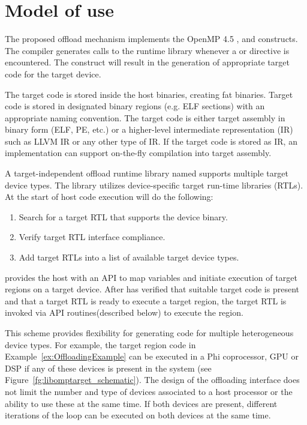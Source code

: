 \section{Model of use}

The proposed offload mechanism implements the OpenMP 4.5 \dtargetdata{}, \dtarget{} and \ddeclaretarget{} constructs. The compiler generates calls to the runtime library whenever a \dtargetdata{} or \dtarget{} directive is encountered. The \ddeclaretarget{} construct will result in the generation of appropriate target code for the target device.

The target code is stored inside the host binaries, creating fat binaries. Target code is stored in designated binary regions (e.g. ELF sections) with an appropriate naming convention. The target code is either target assembly in binary form (ELF, PE, etc.) or a higher-level intermediate representation (IR) such as LLVM IR or any other type of IR. If the target code is stored as IR, an implementation can support on-the-fly compilation into target assembly.

A target-independent offload runtime library named \libomptarget{} supports multiple target device types. The \libomptarget{} library utilizes device-specific target run-time libraries (RTLs). At the start of host code execution \libomptarget{} will do the following:

\begin{enumerate}
  \item Search for a target RTL that supports the device binary. 

  \item Verify target RTL interface compliance.

  \item Add target RTLs into a list of available target device types. 
\end{enumerate}

\libomptarget{} provides the host with an API to map variables and initiate execution of target regions on a target device. After \libomptarget{} has verified that suitable target code is present and that a target RTL is ready to execute a target region, the target RTL is invoked via API routines(described below) to execute the region.

This scheme provides flexibility for generating code for multiple heterogeneous device types. For example, the target region code in Example~\ref{ex:OffloadingExample} can be executed in a Phi\texttrademark{} coprocessor, GPU or DSP if any of these devices is present in the system (see Figure~\ref{fg:libomptarget_schematic}). The design of the offloading interface does not limit the number and type of devices associated to a host processor or the ability to use these at the same time. If both devices are present, different iterations of the loop can be executed on both devices at the same time.

